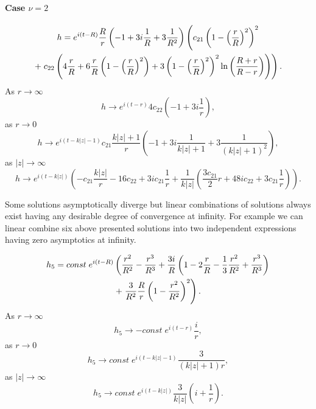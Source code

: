 \documentclass[letterpaper,12pt]{article}
\begin{document}
\paragraph{Case $\nu=2$}
\begin{gather}
\label{}
h=e^{i(t-R)}\frac{R}{r}\left(-1+3i\frac{1}{R}+3\frac{1}{R^2}\right)
\left(c_{21}\left(1-\left(\frac{r}{R}\right)^2\right)^2\right.\notag\\
 +
\left.c_{22}\left(4\frac{r}{R}+6\frac{r}{R}
 \left(1-\left(\frac{r}{R}\right)^2\right)+
 3\left(1-\left(\frac{r}{R}\right)^2\right)^2
 \ln\left(\frac{R+r}{R-r}\right)\right)\right).
\end{gather}
As $r\to \infty$
\begin {equation}
\label{}
 h\to e^{i(t-r)}4c_{22}\left(-1+3i\frac{1}{r}\right),
\end{equation}
as $r\to 0$
\begin {equation}
\label{}
 h\to e^{i(t-k|z|-1)}c_{21}\frac{k|z|+1}{r}\left(-1+3i\frac{1}{k|z|+1}
 +3\frac{1}{(k|z|+1)^2}\right),
\end{equation}
as $|z|\to \infty$
\begin {equation}
\label{}
 h\to e^{i(t-k|z|)}\left(-c_{21}\frac{k|z|}{r}-16c_{22} + 3ic_{21}\frac{1}{r}+
\frac{1}{k|z|}\left(\frac{3c_{21}}{2}r+48ic_{22}+3c_{21}\frac{1}{r}\right)\right).
\end{equation}

Some solutions  asymptotically diverge but linear combinations of
solutions always exist  having any desirable degree of convergence
at infinity. For example  we can linear combine six above
presented solutions into two independent expressions having zero
asymptotics at infinity.

\begin{gather}
 h_5=const\; e^{i(t-R)}\left(\frac{r^2}{R^2} - \frac{r^3}{R^3} +
 {\frac{3i}{R}}\left(1 - 2\frac{r}{R} -
 {\frac{1}{3}}\frac{r^2}{R^2} + \frac{r^3}{R^3}\right)
 \right.\notag\\
 +\left.{\frac{3}{R^2}}\frac{R}{r}\left(1 -
\frac{r^2}{R^2}\right)^2\right).
\end{gather}
 As $r\to \infty$
\begin {equation}
\label{}
 h_5\to -const\; e^{i(t-r)}\frac{i}{r},
\end{equation}
as $r\to 0$
\begin {equation}
\label{}
 h_5\to const\; e^{i(t-k|z|-1)}\frac{3}{(k|z|+1)r},
\end{equation}
as $|z|\to \infty$
\begin {equation}
\label{}
 h_5\to const\; e^{i(t-k|z|)}\frac{3}{k|z|}\left(i +\frac{1}{r}\right).
\end{equation}
\end{document}
